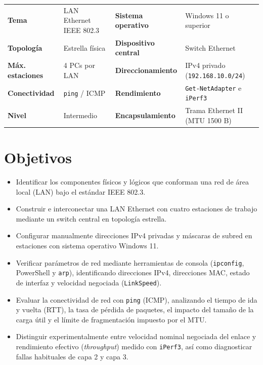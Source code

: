\documentclass[11pt, a4paper]{article}
\begin{document}
\begin{table}[h!]
\centering
\begin{tabularx}{\textwidth}{>{\bfseries}l X >{\bfseries}l X}
\toprule
Tema & LAN Ethernet IEEE 802.3 & Sistema operativo & Windows 11 o superior \\
Topología & Estrella física & Dispositivo central & Switch Ethernet \\
Máx. estaciones & 4 PCs por LAN & Direccionamiento & IPv4 privado (\texttt{192.168.10.0/24}) \\
Conectividad & \texttt{ping} / ICMP & Rendimiento & \texttt{Get-NetAdapter} e \texttt{iPerf3} \\
Nivel & Intermedio & Encapsulamiento & Trama Ethernet II (MTU 1500 B) \\
\bottomrule
\end{tabularx}
\end{table}

\section{Objetivos}

\begin{itemize}
    \item Identificar los componentes físicos y lógicos que conforman una red de área local (LAN) bajo el estándar IEEE 802.3.
    \item Construir e interconectar una LAN Ethernet con cuatro estaciones de trabajo mediante un switch central en topología estrella.
    \item Configurar manualmente direcciones IPv4 privadas y máscaras de subred en estaciones con sistema operativo Windows 11.
    \item Verificar parámetros de red mediante herramientas de consola (\texttt{ipconfig}, PowerShell y \texttt{arp}), identificando direcciones IPv4, direcciones MAC, estado de interfaz y velocidad negociada (\texttt{LinkSpeed}).
    \item Evaluar la conectividad de red con \texttt{ping} (ICMP), analizando el tiempo de ida y vuelta (RTT), la tasa de pérdida de paquetes, el impacto del tamaño de la carga útil y el límite de fragmentación impuesto por el MTU.
    \item Distinguir experimentalmente entre velocidad nominal negociada del enlace y rendimiento efectivo (\textit{throughput}) medido con \texttt{iPerf3}, así como diagnosticar fallas habituales de capa 2 y capa 3.
\end{itemize}
\end{document}
